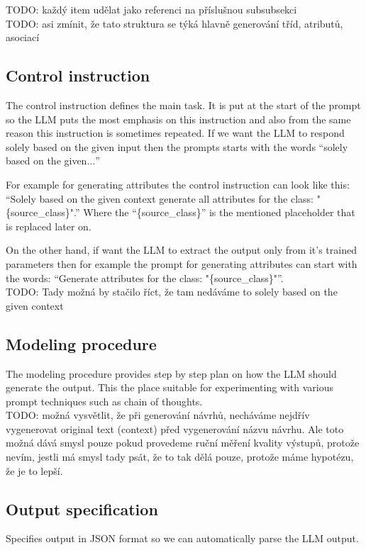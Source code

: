 TODO: každý item udělat jako referenci na příslušnou subsubsekci \\

TODO: asi zmínit, že tato struktura se týká hlavně generování tříd, atributů, asociací


\subsection{Control instruction}
The control instruction defines the main task. It is put at the start of the prompt so the LLM puts the most emphasis on this instruction and also from the same reason this instruction is sometimes repeated. If we want the LLM to respond solely based on the given input then the prompts starts with the words ``solely based on the given$\ldots$''

For example for generating attributes the control instruction can look like this:
``Solely based on the given context generate all attributes for the class: "\{source\_class\}".'' Where the ``\{source\_class\}'' is the mentioned placeholder that is replaced later on.

On the other hand, if want the LLM to extract the output only from it's trained parameters then for example the prompt for generating attributes can start with the words: ``Generate attributes for the class: "\{source\_class\}"''. \\

TODO: Tady možná by stačilo říct, že tam nedáváme to solely based on the given context \\


\subsection{Modeling procedure}
The modeling procedure provides step by step plan on how the LLM should generate the output. This the place suitable for experimenting with various prompt techniques such as chain of thoughts. \\

TODO: možná vysvětlit, že při generování návrhů, necháváme nejdřív vygenerovat original text (context) před vygenerování názvu návrhu. Ale toto možná dává smysl pouze pokud provedeme ruční měření kvality výstupů, protože nevím, jestli má smysl tady psát, že to tak dělá pouze, protože máme hypotézu, že je to lepší.


\subsection{Output specification}
Specifies output in JSON format so we can automatically parse the LLM output.


